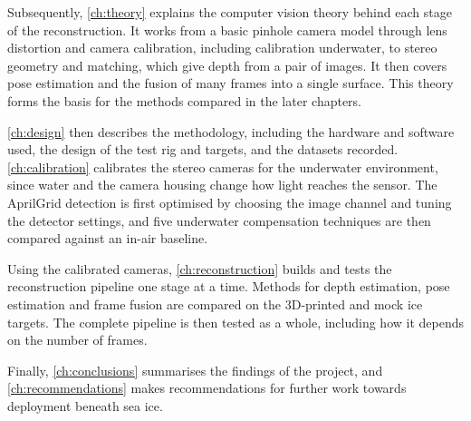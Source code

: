 Subsequently, \autoref{ch:theory} explains the computer vision theory behind each stage of the reconstruction.
It works from a basic pinhole camera model through lens distortion and camera calibration, including calibration
underwater, to stereo geometry and matching, which give depth from a pair of images. It then covers pose estimation
and the fusion of many frames into a single surface. This theory forms the basis for the methods compared in the
later chapters.

\autoref{ch:design} then describes the methodology, including the hardware and software used, the design of the test
rig and targets, and the datasets recorded. 
\autoref{ch:calibration} calibrates the stereo cameras for the underwater environment, since water and the camera
housing change how light reaches the sensor. The AprilGrid detection is first optimised by choosing the image channel
and tuning the detector settings, and five underwater compensation techniques are then compared against an in-air baseline.

Using the calibrated cameras, \autoref{ch:reconstruction} builds and tests the reconstruction pipeline one stage at a
time. Methods for depth estimation, pose estimation and frame fusion are compared on the 3D-printed and mock ice
targets. The complete pipeline is then tested as
a whole, including how it depends on the number of frames.

Finally, \autoref{ch:conclusions} summarises the findings of the project, and \autoref{ch:recommendations} makes
recommendations for further work towards deployment beneath sea ice.

